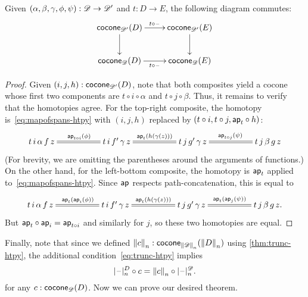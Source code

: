 \begin{lem}\label{thm:conemap-funct}
  Given $(\alpha,\beta,\gamma,\phi,\psi):\Ddiag \to \Ddiag'$ and $t:D\to E$, the following diagram commutes:
  \begin{equation*}
    \vcenter{\xymatrix{
        \cocone{\Ddiag'}{D}\ar[r]^{t \circ {\blank}}\ar[d] &
        \cocone{\Ddiag'}{E}\ar[d]\\
        \cocone{\Ddiag}{D}\ar[r]_{t \circ {\blank}} &
        \cocone{\Ddiag}{E}
      }}
  \end{equation*}
\end{lem}
\begin{proof}
  Given $(i,j,h):\cocone{\Ddiag'}{D}$, note that both composites yield a cocone whose first two components are $t\circ i\circ \alpha$ and $t\circ j\circ\beta$.
  Thus, it remains to verify that the homotopies agree.
  For the top-right composite, the homotopy is~\eqref{eq:mapofspans-htpy} with $(i,j,h)$ replaced by $(t\circ i, t\circ j, \apfunc{t}\circ h)$:
  \begin{equation*}
    \xymatrix@+2.8em{
      {t \, i \, \alpha \, f \, z} \ar@{=}[r]^{\apfunc{t\circ i}(\phi)} &
      {t \, i \, f' \, \gamma \, z} \ar@{=}[r]^{\apfunc{t}(h(\gamma(z)))} &
      {t \, j \, g' \, \gamma \, z} \ar@{=}[r]^{\apfunc{t\circ j}(\psi)} &
      {t \, j \, \beta \, g \, z}
    }
  \end{equation*}
  (For brevity, we are omitting the parentheses around the arguments of functions.)
  On the other hand, for the left-bottom composite, the homotopy is $\apfunc{t}$ applied to~\eqref{eq:mapofspans-htpy}.
  Since $\apfunc{}$ respects path-concatenation, this is equal to
  \begin{equation*}
    \xymatrix@+2.8em{
      {t \, i \, \alpha \, f \, z} \ar@{=}[r]^{\apfunc{t}(\apfunc{i}(\phi))} &
      {t \, i \, f' \, \gamma \, z} \ar@{=}[r]^{\apfunc{t}(h(\gamma(z)))} &
      {t \, j \, g' \, \gamma \, z} \ar@{=}[r]^{\apfunc{t}(\apfunc{j}(\psi))} &
      {t \, j \, \beta \, g \, z}. }
  \end{equation*}
  But $\apfunc{t}\circ \apfunc{i} = \apfunc{t\circ i}$ and similarly for $j$, so these two homotopies are equal.
\end{proof}

Finally, note that since we defined $\trunc nc : \cocone{\trunc n \Ddiag}{\trunc n D}$ using \cref{thm:trunc-htpy}, the additional condition~\eqref{eq:trunc-htpy} implies
\begin{equation}
  \tprojf[D] n \circ c = \trunc n c \circ \tprojf[\Ddiag]n. \label{eq:conetrunc}
\end{equation}
for any $c:\cocone{\Ddiag}{D}$.
Now we can prove our desired theorem.


